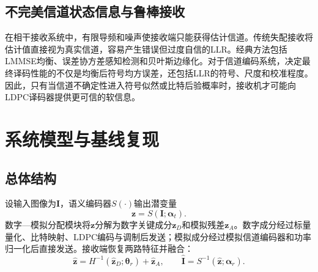 \documentclass[UTF8,a4paper,11pt]{ctexart}
\newcommand{\LLR}{LLR}
\newcommand{\LDPC}{LDPC}
\begin{document}
\subsection{不完美信道状态信息与鲁棒接收}
在相干接收系统中，有限导频和噪声使接收端只能获得估计信道。传统失配接收将估计值直接视为真实信道，容易产生错误但过度自信的\LLR{}。经典方法包括LMMSE均衡、误差协方差感知检测和贝叶斯边缘化\cite{kay1993estimation,proakis2007digital}。对于信道编码系统，决定最终译码性能的不仅是均衡后符号均方误差，还包括\LLR{}的符号、尺度和校准程度。因此，只有当信道不确定性进入符号似然或比特后验概率时，接收机才可能向\LDPC{}译码器提供更可信的软信息。

\section{系统模型与基线复现}
\subsection{总体结构}
设输入图像为$\bm I$，语义编码器$S(\cdot)$输出潜变量
\begin{equation}
  \bm z=S(\bm I;\bm\alpha_t).
  \label{eq:semantic_encoder}
\end{equation}
数字—模拟分配模块将$\bm z$分解为数字关键成分$\bm z_D$和模拟残差$\bm z_A$。数字成分经过标量量化、比特映射、\LDPC{}编码与调制后发送；模拟成分经过模拟信道编码器和功率归一化后直接发送。接收端恢复两路特征并融合：
\begin{equation}
  \hat{\bm z}=H^{-1}(\hat{\bm z}_D;\bm\theta_r)+\hat{\bm z}_A,
  \qquad
  \hat{\bm I}=S^{-1}(\hat{\bm z};\bm\alpha_r).
  \label{eq:hda_fusion}
\end{equation}
\end{document}
